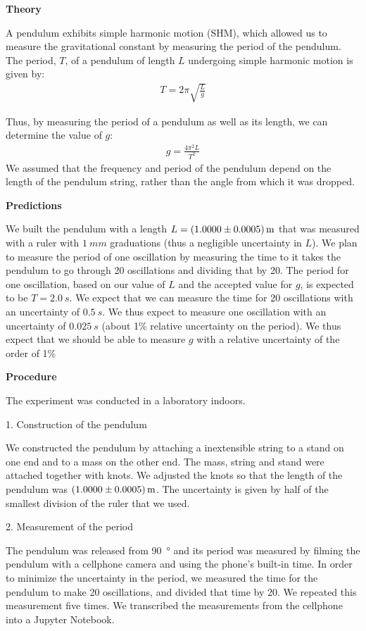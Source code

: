 \textbf{Theory}

A pendulum exhibits simple harmonic motion (SHM), which allowed us to measure the gravitational constant by measuring the period of the pendulum. The period, $T$, of a pendulum of length $L$ undergoing simple harmonic motion is given by:
\begin{align*}
T=2\pi \sqrt {\frac{L}{g}}
\end{align*}

Thus, by measuring the period of a pendulum as well as its length, we can determine the value of $g$:
\begin{align*}
g=\frac{4\pi^{2}L}{T^{2}}
\end{align*}
We assumed that the frequency and period of the pendulum depend on the length of the pendulum string, rather than the angle from which it was dropped. 

\textbf{Predictions}

We built the pendulum with a length $L=\SI{1.0000\pm 0.0005}{m}$ that was measured with a ruler with $\SI{1}{mm}$ graduations (thus a negligible uncertainty in $L$). We plan to measure the period of one oscillation by measuring the time to it takes the pendulum to go through 20 oscillations and dividing that by 20. The period for one oscillation, based on our value of $L$ and the accepted value for $g$, is expected to be $T=\SI{2.0}{s}$. We expect that we can measure the time for 20 oscillations with an uncertainty of $\SI{0.5}{s}$. We thus expect to measure one oscillation with an uncertainty of $\SI{0.025}{s}$ (about 1\% relative uncertainty on the period). We thus expect that we should be able to measure $g$ with a relative uncertainty of the order of 1\%


\textbf{Procedure}

The experiment was conducted in a laboratory indoors.

1. Construction of the pendulum

We constructed the pendulum by attaching a inextensible string to a stand on one end and to a mass on the other end. The mass, string and stand were attached together with knots. We adjusted the knots so that the length of the pendulum was $\SI{1.0000\pm0.0005}{m}$. The uncertainty is given by half of the smallest division of the ruler that we used.


2. Measurement of the period

The pendulum was released from \SI{90}{\degree} and its period was measured by filming the pendulum with a cellphone camera and using the phone's built-in time. In order to minimize the uncertainty in the period, we measured the time for the pendulum to make 20 oscillations, and divided that time by 20. We repeated this measurement five times. We transcribed the measurements from the cellphone into a Jupyter Notebook.


